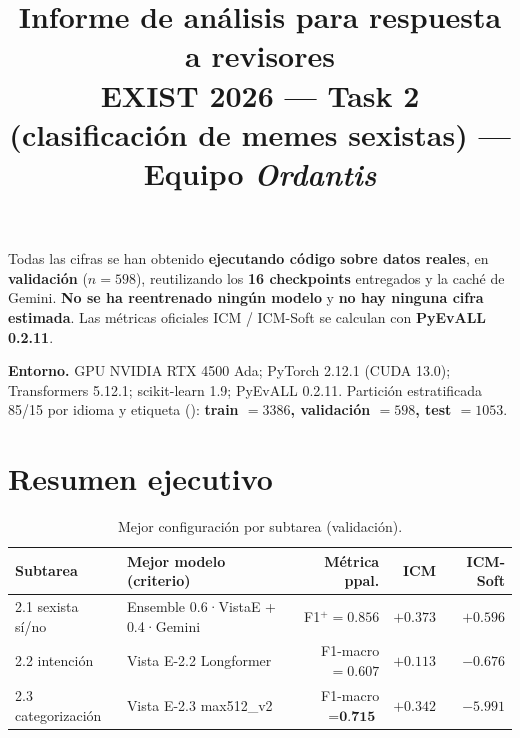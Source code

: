 \documentclass[11pt,a4paper]{article}
\title{\vspace{-1.2cm}\textbf{Informe de análisis para respuesta a revisores}\\[2pt]
  \large EXIST 2026 --- Task 2 (clasificación de memes sexistas) --- Equipo \emph{Ordantis}}
\author{}
\date{}
\newcommand{\best}[1]{\textbf{#1}}
\newcommand{\code}[1]{\texttt{\detokenize{#1}}}
\begin{document}
\maketitle
\vspace{-1.4cm}

\begin{finding}
Todas las cifras se han obtenido \textbf{ejecutando código sobre datos reales}, en
\textbf{validación} ($n=598$), reutilizando los \textbf{16 checkpoints} entregados y la caché de
Gemini. \textbf{No se ha reentrenado ningún modelo} y \textbf{no hay ninguna cifra estimada}. Las
métricas oficiales ICM / ICM-Soft se calculan con \textbf{PyEvALL 0.2.11}.
\end{finding}

\noindent\textbf{Entorno.} GPU NVIDIA RTX 4500 Ada; PyTorch 2.12.1 (CUDA 13.0); Transformers
5.12.1; scikit-learn 1.9; PyEvALL 0.2.11. Partición estratificada 85/15 por idioma y etiqueta
(\code{SEED=42}): \textbf{train $=3386$, validación $=598$, test $=1053$}.

\tableofcontents
\bigskip

\section{Resumen ejecutivo}

\begin{table}[h]\centering\small
\caption{Mejor configuración por subtarea (validación).}
\begin{tabular}{@{}llrrr@{}}
\toprule
Subtarea & Mejor modelo (criterio) & Métrica ppal. & ICM & ICM-Soft \\
\midrule
2.1 sexista sí/no & Ensemble 0.6·VistaE + 0.4·Gemini & F1$^{+}=0.856$ & $+0.373$ & \best{$+0.596$} \\
2.2 intención     & Vista E-2.2 Longformer          & F1-macro$=0.607$ & \best{$+0.113$} & $-0.676$ \\
2.3 categorización& Vista E-2.3 max512\_v2           & F1-macro$=\best{0.715}$ & $+0.342$ & $-5.991$ \\
\bottomrule
\end{tabular}
\end{table}
\end{document}
